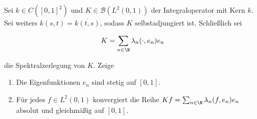 \begin{exercise}[37/1]

Sei $k \in C([0, 1]^2)$ und $K \in \mathcal{B}(L^2(0, 1))$ der Integraloperator mit Kern $k$.
Sei weiters $k(s, t) = \overline{k(t, s)}$, sodass $K$ selbstadjungiert ist.
Schließlich sei

\begin{align*}
  K
  =
  \sum_{n \in \N}
  \lambda_n
  (\cdot, e_n)
  e_n
\end{align*}

die Spektralzerlegung von $K$.
Zeige

\begin{enumerate}[label = (\alph*)]

  \item
  Die Eigenfunktionen $e_n$ sind stetig auf $[0, 1]$.

  \item
  Für jedes $f \in L^2(0, 1)$ konvergiert die Reihe $K f = \sum_{n \in \N} \lambda_n (f, e_n) e_n$ absolut und gleichmäßig auf $[0, 1]$.

\end{enumerate}

\end{exercise}


